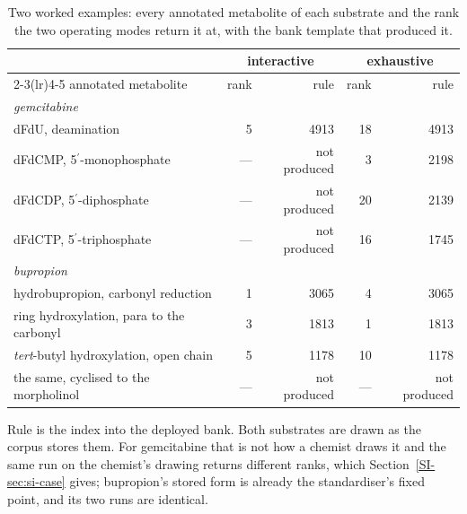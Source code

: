 \begin{table}[t]
\centering\small
\begin{threeparttable}
\caption{Two worked examples: every annotated metabolite of each substrate and the rank the two operating modes return it at, with the bank template that produced it.}
\label{tab:case}
\begin{tabular}{lrrrr}
\toprule
 & \multicolumn{2}{c}{interactive} & \multicolumn{2}{c}{exhaustive} \\
\cmidrule(lr){2-3}\cmidrule(lr){4-5}
annotated metabolite & rank & rule & rank & rule \\
\midrule
\multicolumn{5}{l}{\emph{gemcitabine}} \\
\quad dFdU, deamination & 5 & 4913 & 18 & 4913 \\
\quad dFdCMP, 5$^\prime$-monophosphate & --- & not produced & 3 & 2198 \\
\quad dFdCDP, 5$^\prime$-diphosphate & --- & not produced & 20 & 2139 \\
\quad dFdCTP, 5$^\prime$-triphosphate & --- & not produced & 16 & 1745 \\
\midrule
\multicolumn{5}{l}{\emph{bupropion}} \\
\quad hydrobupropion, carbonyl reduction & 1 & 3065 & 4 & 3065 \\
\quad ring hydroxylation, para to the carbonyl & 3 & 1813 & 1 & 1813 \\
\quad \emph{tert}-butyl hydroxylation, open chain & 5 & 1178 & 10 & 1178 \\
\quad the same, cyclised to the morpholinol & --- & not produced & --- & not produced \\
\bottomrule
\end{tabular}
\begin{tablenotes}[flushleft]\footnotesize
\item Rule is the index into the deployed bank. Both substrates are drawn as the corpus stores them. For gemcitabine that is not how a chemist draws it and the same run on the chemist's drawing returns different ranks, which Section~\ref{SI-sec:si-case} gives; bupropion's stored form is already the standardiser's fixed point, and its two runs are identical.
\end{tablenotes}
\end{threeparttable}
\end{table}
